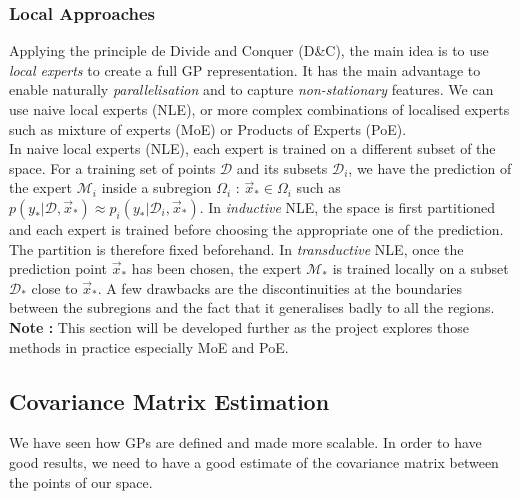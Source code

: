 \subsubsection{Local Approaches}

Applying the principle de Divide and Conquer (D\&C), the main idea is to use \textit{local experts} to create a full GP representation. It has the main advantage to enable naturally \textit{parallelisation} and to capture \textit{non-stationary} features. We can use naive local experts (NLE), or more complex combinations of localised experts such as mixture of experts (MoE) or Products of Experts (PoE). \\

In naive local experts (NLE), each expert is trained on a different subset of the space. For a training set of points $\mathcal{D}$ and its subsets $\mathcal{D}_i$, we have the prediction of the expert $\mathcal{M}_i$ inside a subregion $\Omega_i$ : $\vec{x}_* \in \Omega_i$ such as $p(y_* | \mathcal{D}, \vec{x}_*) \approx p_i(y_* | \mathcal{D}_i, \vec{x}_*) $. In \textit{inductive} NLE, the space is first partitioned and each expert is trained before choosing the appropriate one of the prediction. The partition is therefore fixed beforehand. In \textit{transductive} NLE, once the prediction point $\vec{x}_*$ has been chosen,  the expert $\mathcal{M}_*$ is trained locally on a subset $\mathcal{D}_*$ close to $\vec{x}_*$. A few drawbacks are the discontinuities at the boundaries between the subregions and the fact that it generalises badly to all the regions. \\

\textbf{Note :} This section will be developed further as the project explores those methods in practice especially MoE and PoE. 

\subsection{Covariance Matrix Estimation} \label{sec:cov_est}

We have seen how GPs are defined and made more scalable. In order to have good results, we need to have a good estimate of the covariance matrix between the points of our space. \\




